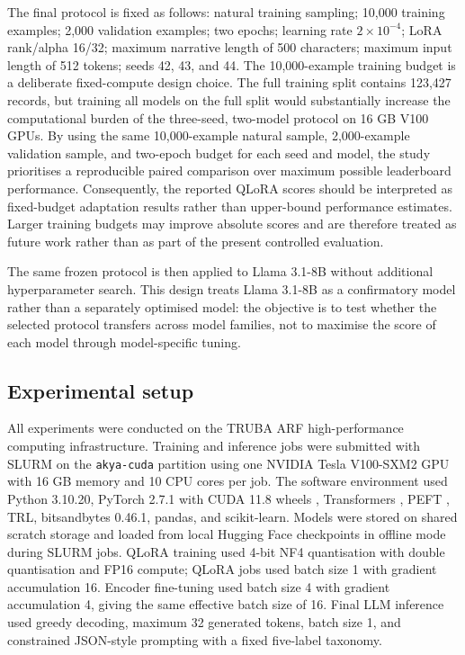 \documentclass{elektr}
\begin{document}
The final protocol is fixed as follows: natural training sampling; 10,000 training examples; 2,000 validation examples; two epochs; learning rate $2 \times 10^{-4}$; LoRA rank/alpha 16/32; maximum narrative length of 500 characters; maximum input length of 512 tokens; seeds 42, 43, and 44.
The 10,000-example training budget is a deliberate fixed-compute design choice. The full training split contains 123,427 records, but training all models on the full split would substantially increase the computational burden of the three-seed, two-model protocol on 16 GB V100 GPUs. By using the same 10,000-example natural sample, 2,000-example validation sample, and two-epoch budget for each seed and model, the study prioritises a reproducible paired comparison over maximum possible leaderboard performance. Consequently, the reported QLoRA scores should be interpreted as fixed-budget adaptation results rather than upper-bound performance estimates. Larger training budgets may improve absolute scores and are therefore treated as future work rather than as part of the present controlled evaluation.

The same frozen protocol is then applied to Llama 3.1-8B without additional hyperparameter search. This design treats Llama 3.1-8B as a confirmatory model rather than a separately optimised model: the objective is to test whether the selected protocol transfers across model families, not to maximise the score of each model through model-specific tuning.

\subsection{Experimental setup}

All experiments were conducted on the TRUBA ARF high-performance computing infrastructure. Training and inference jobs were submitted with SLURM on the \texttt{akya-cuda} partition using one NVIDIA Tesla V100-SXM2 GPU with 16 GB memory and 10 CPU cores per job. The software environment used Python 3.10.20, PyTorch 2.7.1 with CUDA 11.8 wheels \cite{paszke2019pytorch}, Transformers \cite{wolf2020transformers}, PEFT \cite{mangrulkar2022peft}, TRL, bitsandbytes 0.46.1, pandas, and scikit-learn. Models were stored on shared scratch storage and loaded from local Hugging Face checkpoints in offline mode during SLURM jobs. QLoRA training used 4-bit NF4 quantisation with double quantisation and FP16 compute; QLoRA jobs used batch size 1 with gradient accumulation 16. Encoder fine-tuning used batch size 4 with gradient accumulation 4, giving the same effective batch size of 16. Final LLM inference used greedy decoding, maximum 32 generated tokens, batch size 1, and constrained JSON-style prompting with a fixed five-label taxonomy.
\end{document}
